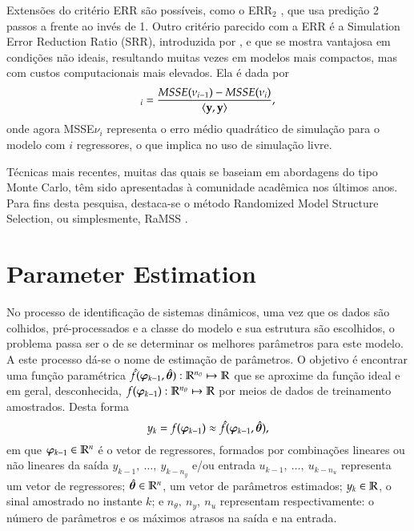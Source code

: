 Extensões do critério ERR são possíveis, como o ERR$_2$ \citep{alves2012}, que usa predição 2 passos a frente ao invés de 1.
Outro critério parecido com a ERR é a Simulation Error Reduction Ratio (SRR), introduzida por \citep{piroddi2003}, e que se mostra vantajosa em condições não ideais, resultando muitas vezes em modelos mais compactos, mas com custos computacionais mais elevados. Ela é dada por
\begin{equation}
[\text{SRR}]_i  = \frac{MSSE(\nu_{i-1})-MSSE(\nu_i)}{\langle\vy,\vy\rangle}
\label{eq:SRR},
\end{equation}
onde agora MSSE$\nu_i$ representa o erro médio quadrático de simulação para o modelo com $i$ regressores, o que implica no uso de simulação livre.

Técnicas mais recentes, muitas das quais se baseiam em abordagens do tipo Monte Carlo, têm sido apresentadas à comunidade acadêmica nos últimos anos. Para fins desta pesquisa, destaca-se o método Randomized Model Structure Selection, ou simplesmente, RaMSS \citep{falsone2014,falsone2015}.




\section{Parameter Estimation}%
\label{sec:parest}

No processo de identificação de sistemas dinâmicos, uma vez que os dados são colhidos, pré-processados e a classe do modelo e sua estrutura são escolhidos, o problema passa ser o de se determinar os melhores parâmetros para este modelo. A este processo dá-se o nome de estimação de parâmetros. O objetivo é encontrar uma função paramétrica $\hat{f}(\bm{\varphi}_{k-1},\hat{\bm{\theta}}) :  \mathbb{R}^{n_\theta} \mapsto \mathbb{R}$ que se aproxime da função ideal e em geral, desconhecida, $f(\bm{\varphi}_{k-1}) : \mathbb{R}^{n_\theta} \mapsto \mathbb{R}$ por meios de dados de treinamento amostrados. Desta forma
\begin{equation}
    y_k = f(\bm{\varphi}_{k-1}) \approx \hat{f}(\bm{\varphi}_{k-1},\hat{\bm{\theta}}),
\end{equation}
em que $\bm{\varphi}_{k-1} \in \mathbb{R}^n$ é o vetor de regressores, formados por combinações lineares ou não lineares da saída $y_{k-1},\  \dots ,\ y_{k-n_y}$ e/ou entrada $u_{k-1},\  \dots ,\ u_{k-n_u}$ representa um vetor de regressores; $\hat{\bm{\theta}} \in \mathbb{R}^n$, um vetor de parâmetros estimados; $y_k \in \mathbb{R}$, o sinal amostrado no instante $k$; e $n_{\theta},\ n_y,\ n_u$  representam respectivamente: o número de parâmetros e os máximos atrasos na saída e na entrada. 

